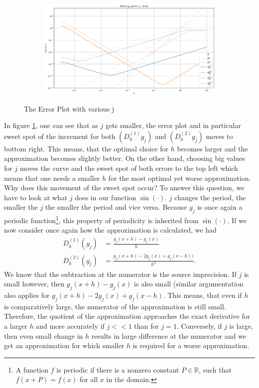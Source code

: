 \begin{figure}[h!]
\begin{subfigure}[b]{0.49\linewidth}
    \end{subfigure}
    \begin{subfigure}[b]{0.49\linewidth}
        \includegraphics[width=\linewidth]{graphics/j_error_plot/tiny_j.png}
    \end{subfigure}
    \caption{The Error Plot with various j}
    \label{fig:exp2_j}
\end{figure}

In figure \ref{fig:exp2_j}, one can see that as \(j\) gets smaller, the error plot and in particular sweet spot of the increment for both \((D^{(1)}_h g_j)\) and \((D^{(2)}_h g_j)\) moves to bottom right. This means, that the optimal choice for \(h\) becomes larger and the approximation becomes slightly better. On the other hand, choosing big values for \(j\) moves the curve and the sweet spot of both errors to the top left which means that one needs a smaller \(h\) for the most optimal yet worse approximation.
Why does this movement of the sweet spot occur? To answer this question, we have to look at what \(j\) does in our function \(\sin(\cdot)\). \(j\) changes the period, the smaller the \(j\) the smaller the period and vice versa. Because \(g_j\) is once again a periodic function\footnote{A function \(f\) is periodic if there is a nonzero constant \(P \in \mathbb{R}\), such that \(f(x + P) = f(x)\) for all \(x\) in the domain.}, this property of periodicity is inherited from \(\sin(\cdot)\). If we now consider once again how the approximation is calculated, we had
\begin{align*}
    D^{(1)}_h (g_j) &= \frac{g_j(x + h) - g_j(x)}{h} \\
    D^{(2)}_h (g_j) &= \frac{g_j(x + h) - 2 g_j(x) + g_j(x - h))}{h^2}\text{.}
\end{align*}
We know that the subtraction at the numerator is the source imprecision. If \(j\) is small however, then \(g_j(x + h) - g_j(x)\) is also small (similar argumentation also applies for \(g_j(x + h) - 2 g_j(x) + g_j(x - h)\). This means, that even if \(h\) is comparatively large, the numerator of the approximation is still small. Therefore, the quotient of the approximation approaches the exact derivative for a larger \(h\) and more accurately if \(j << 1\) than for \(j = 1\). Conversely, if \(j\) is large, then even small change in \(h\) results in large difference at the numerator and we get an approximation for which smaller \(h\) is required for a worse approximation.